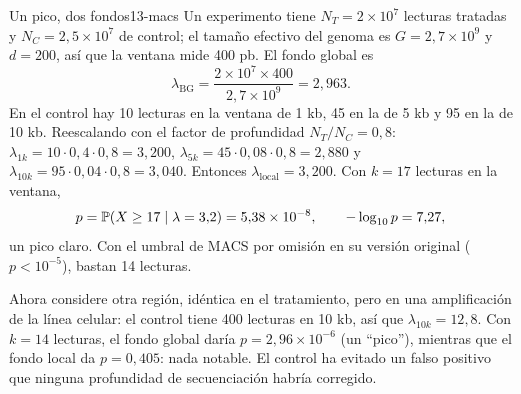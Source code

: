 \begin{ejemplo}{Un pico, dos fondos}{13-macs}
Un experimento tiene $N_T=2\times10^7$ lecturas tratadas y $N_C=2{,}5\times10^7$ de control; el tamaño efectivo del genoma es $G=2{,}7\times10^9$ y $d=200$, así que la ventana mide 400 pb. El fondo global es
\[
\lambda_{\text{BG}} = \frac{2\times10^7\times400}{2{,}7\times10^9} = 2{,}963 .
\]
En el control hay 10 lecturas en la ventana de 1 kb, 45 en la de 5 kb y 95 en la de 10 kb. Reescalando con el factor de profundidad $N_T/N_C=0{,}8$: $\lambda_{1k}=10\cdot0{,}4\cdot0{,}8=3{,}200$, $\lambda_{5k}=45\cdot0{,}08\cdot0{,}8=2{,}880$ y $\lambda_{10k}=95\cdot0{,}04\cdot0{,}8=3{,}040$. Entonces $\lambda_{\text{local}}=3{,}200$. Con $k=17$ lecturas en la ventana,
\[
p = \mathbb{P}(X\ge17\mid\lambda=3{,}2) = 5{,}38\times10^{-8},\qquad -\log_{10}p = 7{,}27,
\]
un pico claro. Con el umbral de MACS por omisión en su versión original ($p<10^{-5}$), bastan 14 lecturas.

Ahora considere otra región, idéntica en el tratamiento, pero en una amplificación de la línea celular: el control tiene 400 lecturas en 10 kb, así que $\lambda_{10k}=12{,}8$. Con $k=14$ lecturas, el fondo global daría $p=2{,}96\times10^{-6}$ (un ``pico''), mientras que el fondo local da $p=0{,}405$: nada notable. El control ha evitado un falso positivo que ninguna profundidad de secuenciación habría corregido.
\end{ejemplo}

